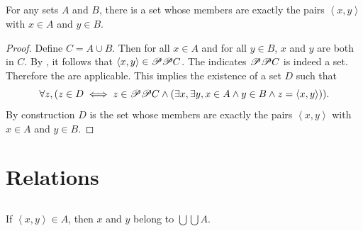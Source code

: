 \documentclass{report}
\newcommand{\pair}[1]{\left< #1 \right>}
\begin{document}
\subsection{}%

\begin{theorem}[3C]

  For any sets $A$ and $B$, there is a set whose members are exactly the
    pairs $\pair{x, y}$ with $x \in A$ and $y \in B$.

\end{theorem}

\begin{proof}



  Define $C = A \cup B$.
  Then for all $x \in A$ and for all $y \in B$, $x$ and $y$ are both in $C$.
  By , it follows that
    $\pair{x, y} \in \powerset{\powerset{C}}$.
  The  indicates $\mathscr{P}\mathscr{P}C$ is
    indeed a set.
  Therefore the  are applicable.
  This implies the existence of a set $D$ such that
    $$\forall z, (z \in D \iff z \in \powerset{\powerset{C}} \land
      (\exists x, \exists y, x \in A \land y \in B \land
        z = \pair{x, y})).$$
  By construction $D$ is the set whose members are exactly the pairs
    $\pair{x, y}$ with $x \in A$ and $y \in B$.

\end{proof}

\section{Relations}%

\subsection{}%

\begin{theorem}[3D]

  If $\pair{x, y} \in A$, then $x$ and $y$ belong to $\bigcup\bigcup A$.

\end{theorem}
\end{document}
